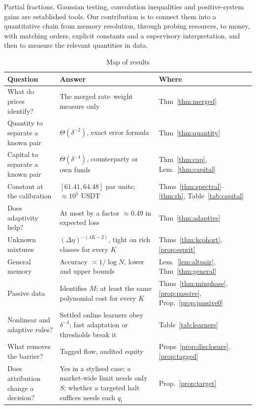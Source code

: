 \documentclass[12pt]{article}
\theoremstyle{definition}
\theoremstyle{remark}
\begin{document}
Partial fractions, Gaussian testing, convolution inequalities and positive-system gains are established tools. Our contribution is to connect them into a quantitative chain from memory resolution, through probing resources, to money, with matching orders, explicit constants and a supervisory interpretation, and then to measure the relevant quantities in data.

\begin{table}[t]\centering\small
\begin{threeparttable}
\caption{Map of results}\label{tab:map}
\begin{tabular}{p{}p{}p{}}
\toprule
Question & Answer & Where\\
\midrule
What do prices identify? & The merged rate--weight measure only & Thm~\ref{thm:merged}\\
Quantity to separate a known pair & $\Theta(\delta^{-2})$, exact error formula & Thm~\ref{thm:quantity}\\
Capital to separate a known pair & $\Theta(\delta^{-4})$, counterparty or own funds & Thm~\ref{thm:cap}, Lem.~\ref{thm:capital}\\
Constant at the calibration & $[61.41,64.48]$ par units; $\approx10^5$ USDT & Thms~\ref{thm:spectral}--\ref{thm:rh}, Table~\ref{tab:capital}\\
Does adaptivity help? & At most by a factor $\approx0.49$ in expected loss & Thm~\ref{thm:adaptive}\\
Unknown mixtures & $(\Delta\eta)^{-(4K-2)}$, tight on rich classes for every $K$ & Thms~\ref{thm:kcohort}, \ref{prop:esprit}\\
General memory & Accuracy $\asymp1/\log N$, lower and upper bounds & Lem.~\ref{lem:altpair}, Thm~\ref{thm:general}\\
Passive data & Identifies $M$; at least the same polynomial cost for every $K$ & Thms~\ref{thm:minphase}, \ref{prop:passive}, Prop.~\ref{prop:passive0}\\
Nonlinear and adaptive rules? & Settled online learners obey $\delta^{-4}$; fast adaptation or thresholds break it & Table~\ref{tab:learners}\\
What removes the barrier? & Tagged flow, audited equity & Props~\ref{prop:disclosure}, \ref{prop:tagged}\\
Does attribution change a decision? & Yes in a stylised case: a market-wide limit needs only $S$; whether a targeted halt suffices needs each $q_i$ & Prop.~\ref{prop:target}\\

\end{tabular}
\end{threeparttable}
\end{table}
\end{document}
